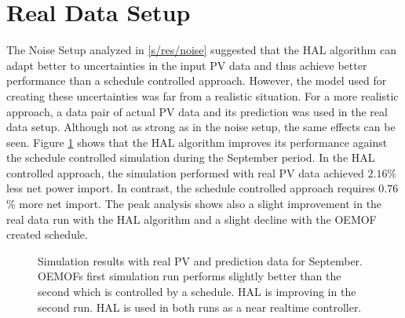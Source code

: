\documentclass[a4paper,12pt]{book}
\theoremstyle{break}
\begin{document}
\section{Real Data Setup}
The Noise Setup analyzed in \ref{s/res/noise} suggested that the HAL algorithm can adapt better to uncertainties in the input \ac{PV} data and thus achieve better performance than a schedule controlled approach. However, the model used for creating these uncertainties was far from a realistic situation. 
For a more realistic approach, a data pair of actual \ac{PV} data and its prediction was used in the real data setup. 
Although not as strong as in the noise setup, the same effects can be seen. Figure \ref{f/res/real/total} shows that the HAL algorithm improves its performance against the schedule controlled simulation during the September period. In the HAL controlled approach, the simulation performed with real \ac{PV} data achieved $2.16$\% less net power import. In contrast, the schedule controlled approach requires $0.76$\% more net import. The peak analysis shows also a slight improvement in the real data run with the HAL algorithm and a slight decline with the \ac{OEMOF} created schedule.
\begin{figure}[htp]
	\centering
	\caption{Simulation results with real PV and prediction data for September. \ac{OEMOF}s first simulation run performs slightly better than the second which is controlled by a schedule. HAL is improving in the second run. HAL is used in both runs as a near realtime controller.}%
	\label{f/res/real/total}%
\end{figure}
\end{document}
